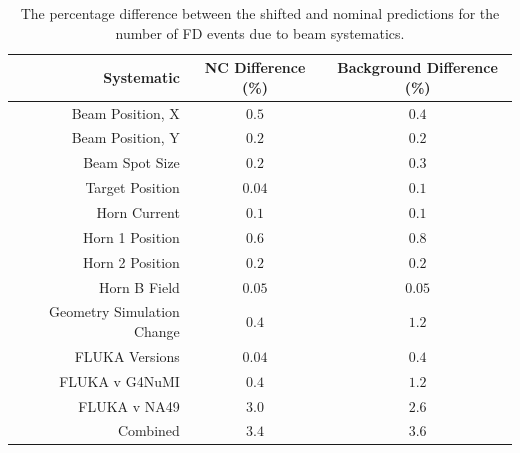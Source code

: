 \begin{table}[htb]
  \begin{center}
    \begin{tabular}{r c c}
      \hline\hline
      Systematic & NC Difference (\%) & Background Difference (\%) \\
      \hline
      Beam Position, X & $0.5$ & $0.4$ \\
      Beam Position, Y & $0.2$ & $0.2$ \\
      Beam Spot Size & $0.2$ & $0.3$ \\
      Target Position & $0.04$ & $0.1$ \\
      Horn Current & $0.1$ & $0.1$ \\
      Horn 1 Position & $0.6$ & $0.8$ \\
      Horn 2 Position & $0.2$ & $0.2$ \\
      Horn B Field & $0.05$ & $0.05$ \\
      Geometry Simulation Change & $0.4$ & $1.2$ \\
      FLUKA Versions & $0.04$ & $0.4$ \\
      FLUKA v G4NuMI & $0.4$ & $1.2$ \\
      FLUKA v NA49 & $3.0$ & $2.6$ \\
      \hline
      Combined & $3.4$ & $3.6$ \\
      \hline
    \end{tabular}
    \caption[Beam Systematic Errors]{The percentage difference between the shifted and nominal predictions for the number of FD events due to beam systematics.}
    \label{tab:SystBeam}
  \end{center}
\end{table}

